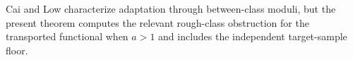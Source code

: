 Cai and Low characterize adaptation through between-class moduli, but the present theorem computes the relevant rough-class obstruction for the transported functional when \(a>1\) and includes the independent target-sample floor.